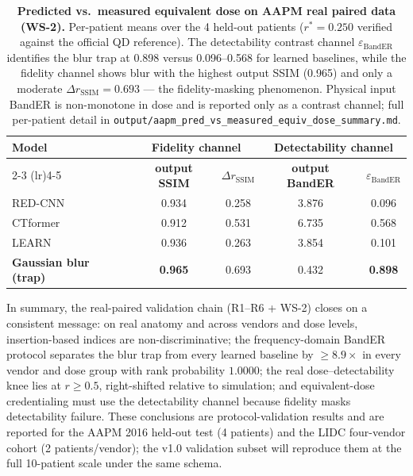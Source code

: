 \documentclass[twoside,11pt]{article}
\begin{document}
\begin{table}[ht]
    \centering
    \small
    \setlength{\tabcolsep}{4pt}
    \begin{tabular}{lcccc}
        \toprule
        \multirow{2}{*}{\textbf{Model}} & \multicolumn{2}{c}{\textbf{Fidelity channel}} & \multicolumn{2}{c}{\textbf{Detectability channel}} \\
        \cmidrule(lr){2-3} \cmidrule(lr){4-5}
        & \textbf{output SSIM} & $\Delta r_{\mathrm{SSIM}}$ & \textbf{output BandER} & $\varepsilon_{\mathrm{BandER}}$ \\
        \midrule
        RED-CNN   & 0.934 & 0.258 & 3.876 & 0.096 \\
        CTformer  & 0.912 & 0.531 & 6.735 & 0.568 \\
        LEARN     & 0.936 & 0.263 & 3.854 & 0.101 \\
        \textbf{Gaussian blur (trap)} & \textbf{0.965} & 0.693 & 0.432 & \textbf{0.898} \\
        \bottomrule
    \end{tabular}
    \caption{\textbf{Predicted vs.\ measured equivalent dose on AAPM real paired data (WS-2).} Per-patient means over the 4 held-out patients ($r^{*}=0.250$ verified against the official QD reference). The detectability contrast channel $\varepsilon_{\mathrm{BandER}}$ identifies the blur trap at 0.898 versus 0.096--0.568 for learned baselines, while the fidelity channel shows blur with the highest output SSIM (0.965) and only a moderate $\Delta r_{\mathrm{SSIM}}=0.693$ --- the fidelity-masking phenomenon. Physical input BandER is non-monotone in dose and is reported only as a contrast channel; full per-patient detail in \texttt{output/aapm\_pred\_vs\_measured\_equiv\_dose\_summary.md}.}
    \label{tab:aapm_delta_r}
\end{table}

In summary, the real-paired validation chain (R1--R6 + WS-2) closes on a consistent message: on real anatomy and across vendors and dose levels, insertion-based indices are non-discriminative; the frequency-domain BandER protocol separates the blur trap from every learned baseline by $\geq8.9\times$ in every vendor and dose group with rank probability $1.0000$; the real dose--detectability knee lies at $r\geq0.5$, right-shifted relative to simulation; and equivalent-dose credentialing must use the detectability channel because fidelity masks detectability failure. These conclusions are protocol-validation results and are reported for the AAPM 2016 held-out test (4 patients) and the LIDC four-vendor cohort (2 patients/vendor); the v1.0 validation subset will reproduce them at the full 10-patient scale under the same schema.
\end{document}
